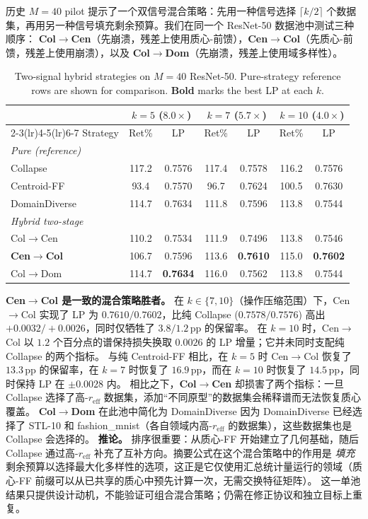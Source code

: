 \documentclass{article}
\newcommand{\reff}{\ensuremath{r_{\mathrm{eff}}}\xspace}
\begin{document}
历史 $M{=}40$ pilot 提示了一个双信号混合策略：先用一种信号选择 $\lceil k/2\rceil$ 个数据集，再用另一种信号填充剩余预算。我们在同一个 ResNet-50 数据池中测试三种顺序：
\textbf{Col$\to$Cen}（先崩溃，残差上使用质心-前馈），\textbf{Cen$\to$Col}（先质心-前馈，残差上使用崩溃），以及 \textbf{Col$\to$Dom}（先崩溃，残差上使用域多样性）。
\begin{table}[h]
\centering
\caption{Two-signal hybrid strategies on $M{=}40$ ResNet-50.
Pure-strategy reference rows are shown for comparison.
\textbf{Bold} marks the best LP at each $k$.}
\label{tab:p2e_hybrid}
\small
\setlength{\tabcolsep}{4pt}
\begin{tabular}{lcccccc}
\toprule
& \multicolumn{2}{c}{$k{=}5$ ($8.0{\times}$)} & \multicolumn{2}{c}{$k{=}7$ ($5.7{\times}$)} & \multicolumn{2}{c}{$k{=}10$ ($4.0{\times}$)} \\
\cmidrule(lr){2-3}\cmidrule(lr){4-5}\cmidrule(lr){6-7}
Strategy & Ret\% & LP & Ret\% & LP & Ret\% & LP \\
\midrule
\multicolumn{7}{l}{\textit{Pure (reference)}} \\
Collapse                  & 117.2 & 0.7576 & 117.4 & 0.7578 & 116.2 & 0.7576 \\
Centroid-FF               &  93.4 & 0.7570 &  96.7 & 0.7624 & 100.5 & 0.7630 \\
DomainDiverse             & 114.7 & 0.7634 & 111.8 & 0.7596 & 113.8 & 0.7544 \\
\midrule
\multicolumn{7}{l}{\textit{Hybrid two-stage}} \\
Col$\to$Cen               & 110.2 & 0.7534 & 111.9 & 0.7496 & 113.8 & 0.7546 \\
\textbf{Cen$\to$Col}      & 106.7 & 0.7596 & 113.6 & \textbf{0.7610} & 115.0 & \textbf{0.7602} \\
Col$\to$Dom               & 114.7 & \textbf{0.7634} & 116.0 & 0.7562 & 113.8 & 0.7544 \\
\bottomrule
\end{tabular}\normalsize
\end{table}

\textbf{Cen$\to$Col 是一致的混合策略胜者。}
在 $k{\in}\{7,10\}$（操作压缩范围）下，Cen$\to$Col 实现了 LP 为 $0.7610/0.7602$，比纯 Collapse ($0.7578/0.7576$) 高出 ${+}0.0032/{+}0.0026$，同时仅牺牲了 $3.8/1.2$\,pp 的保留率。
在 $k{=}10$ 时，Cen$\to$Col 以 $1.2$ 个百分点的谱保持损失换取 $0.0026$ 的 LP 增量；它并未同时支配纯 Collapse 的两个指标。
与纯 Centroid-FF 相比，在 $k{=}5$ 时 Cen$\to$Col 恢复了 $13.3$\,pp 的保留率，在 $k{=}7$ 时恢复了 $16.9$\,pp，而在 $k{=}10$ 时恢复了 $14.5$\,pp，同时保持 LP 在 $\pm0.0028$ 内。
相比之下，\textbf{Col$\to$Cen} 却损害了两个指标：一旦 Collapse 选择了高-$\reff$ 数据集，添加“不同原型”的数据集会稀释谱而无法恢复质心覆盖。
\textbf{Col$\to$Dom} 在此池中简化为 DomainDiverse 因为 DomainDiverse 已经选择了 STL-10 和 fashion\_mnist（各自领域内高-$\reff$ 的数据集），这些数据集也是 Collapse 会选择的。
\textbf{推论。}
排序很重要：从质心-FF 开始建立了几何基础，随后 Collapse 通过高-\reff 补充了互补方向。摘要公式在这个混合策略中的作用是 \emph{填充} 剩余预算以选择最大化多样性的选项，这正是它仅使用汇总统计量运行的领域（质心-FF 前缀可以从已共享的质心中预先计算一次，无需交换特征矩阵）。
这一单池结果只提供设计动机，不能验证可组合混合策略；仍需在修正协议和独立目标上重复。
\end{document}
